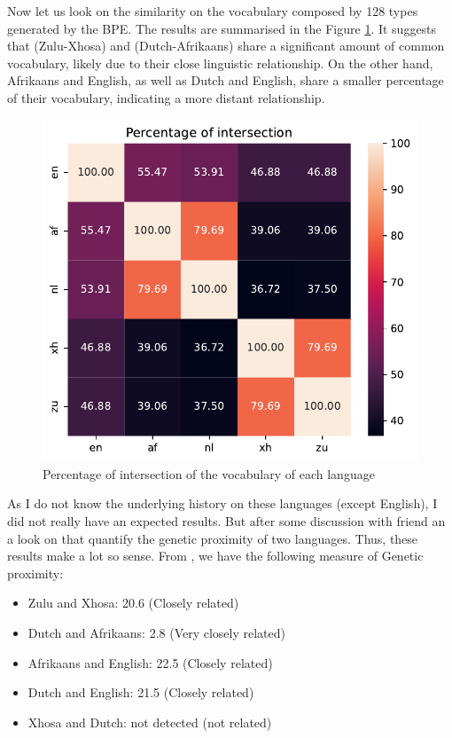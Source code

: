 Now let us look on the similarity on the vocabulary composed by 128 types generated by the BPE. The results are summarised in the Figure \ref{fig:similarity}. It suggests that (Zulu-Xhosa) and (Dutch-Afrikaans) share a significant amount of common vocabulary, likely due to their close linguistic relationship. On the other hand, Afrikaans and English, as well as Dutch and English, share a smaller percentage of their vocabulary, indicating a more distant relationship.

\begin{figure}[H]
	\centering
	\includegraphics[width=0.75\linewidth]{./figures/intersection_cmf.pdf}
	\caption{Percentage of intersection of the vocabulary of each language}
	\label{fig:similarity}
\end{figure}

As I do not know the underlying history on these languages (except English), I did not really have an expected results. But after some discussion with friend an a look on \cite{elinguisticsnet2023compare} that quantify the genetic proximity of two languages.
Thus, these results make a lot so sense. From \cite{elinguisticsnet2023compare}, we have the following measure of Genetic proximity:
\begin{itemize}
	\item Zulu and Xhosa: 20.6 (Closely related)
	\item Dutch and Afrikaans: 2.8 (Very closely related)
	\item Afrikaans and English: 22.5 (Closely related)
	\item Dutch and English: 21.5 (Closely related)
	\item Xhosa and  Dutch: not detected (not related)
\end{itemize}


